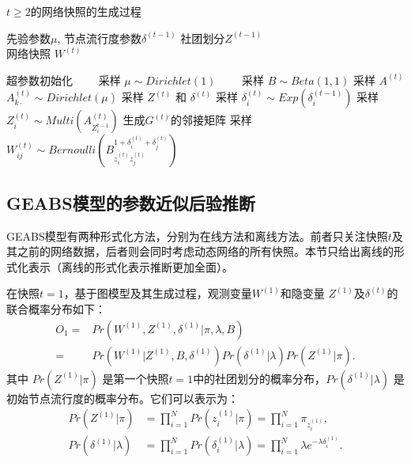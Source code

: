 \begin{algorithm}[H]
\caption{$t \ge 2$的网络快照的生成过程}\label{gent2}
\algorithmicrequire \; 先验参数$\mu$, 节点流行度参数$\delta^{(t-1)}$ 社团划分$Z^{(t-1)}$ \\
\algorithmicensure \; 网络快照 $W^{(t)}$
\begin{algorithmic}[1]
\STATE 超参数初始化
\STATE ~~~~采样 $\mu \sim Dirichlet (1)$ 
\STATE ~~~~采样 $B \sim Beta(1,1)$
\STATE 采样 $A^{(t)}$
\STATE $A^{(t)}_{k\cdot} \sim Dirichlet(\mu)$
\ENDFOR
\STATE 采样 $Z^{(t)}$ 和 $\delta^{(t)}$
\STATE 采样 $\delta^{(t)}_i \sim Exp(\delta^{(t-1)}_i)$
\STATE 采样 $Z^{(t)}_i \sim Multi(A^{(t)}_{Z_i^{t-1}})$
\ENDFOR
\STATE 生成$G^{(t)}的邻接矩阵$
\STATE 采样 $W^{(t)}_{ij} \sim Bernoulli(B_{z_i^{(t)} z_j^{(t)}}^{1+\delta_i^{(t)} + \delta_j^{(t)}})$
\ENDFOR
\end{algorithmic}
\end{algorithm}

\subsection{GEABS模型的参数近似后验推断}



GEABS模型有两种形式化方法，分别为在线方法和离线方法。前者只关注快照$t$及其之前的网络数据，后者则会同时考虑动态网络的所有快照。本节只给出离线的形式化表示（离线的形式化表示推断更加全面）。

在快照$t=1$，基于图模型及其生成过程，观测变量$W^{(1)}$和隐变量 $Z^{(1)}$及$\delta^{(t)}$的联合概率分布如下：
\begin{align}
O_1 = & Pr(W^{(1)}, Z^{(1)}, \delta^{(1)} |\pi, \lambda, B) \nonumber\\
= & Pr(W^{(1)}|Z^{(1)},B,\delta^{(1)})  Pr(\delta^{(1)}|\lambda) Pr(Z^{(1)}|\pi). 
\label{eq:O1}
\end{align}
其中 $Pr(Z^{(1)} | \pi)$ 是第一个快照$t=1$中的社团划分的概率分布，$Pr(\delta^{(1)} | \lambda)$ 是初始节点流行度的概率分布。它们可以表示为：
\begin{align}
Pr (Z^{(1)}|\pi) &= \prod_{i=1}^{N} Pr(z_i^{(1)}|\pi) = \prod_{i=1}^{N} \pi_{z_i^{(1)}}, 
\label{eq:O6}\\
Pr (\delta^{(1)}|\lambda)  &= \prod_{i=1}^{N} Pr(\delta_i^{(1)}|\lambda)
 = \prod_{i=1}^{N} \lambda e^{-\lambda \delta_i^{(1)}}. 
\label{eq:O7}
\end{align}

